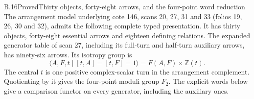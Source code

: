 \begin{result}{B.16}{Proved}{Thirty objects, forty-eight arrows, and the four-point word reduction}
The arrangement model underlying cote 146, scans 20, 27, 31 and
33 (folios 19, 26, 30 and 32), admits the following complete typed
presentation.  It has thirty objects, forty-eight essential
arrows and eighteen defining relations.  The expanded generator
table of scan 27, including its full-turn and half-turn auxiliary
arrows, has ninety-six arrows.  Its isotropy group is
\[
 \langle A,F,t\mid[t,A]=[t,F]=1\rangle=F(A,F)\times\mathbb Z(t).
 \tag{B.19}
\]
The central $t$ is one positive complex-scalar turn in the
arrangement complement.  Quotienting by it gives the four-point
moduli group $F_2$.  The explicit words below give a comparison
functor on every generator, including the auxiliary ones.
\end{result}

